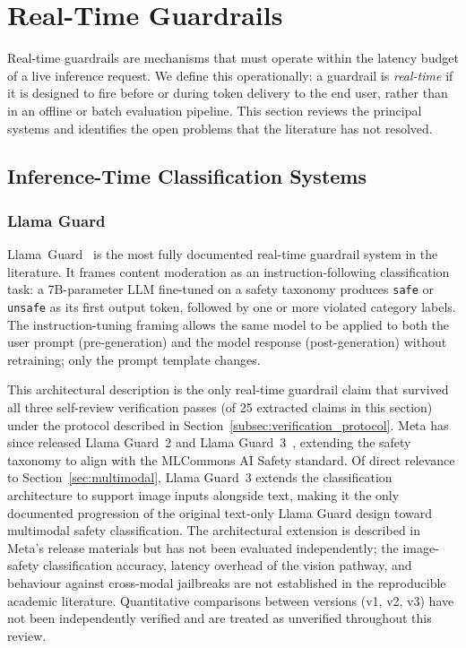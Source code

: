 \section{Real-Time Guardrails}
\label{sec:realtime}

Real-time guardrails are mechanisms that must operate within the latency budget of
a live inference request.
We define this operationally: a guardrail is \emph{real-time} if it is designed to
fire before or during token delivery to the end user, rather than in an offline or
batch evaluation pipeline.
This section reviews the principal systems and identifies the open problems
that the literature has not resolved.

\subsection{Inference-Time Classification Systems}

\subsubsection{Llama Guard}

Llama~Guard~\cite{inan2023llama} is the most fully documented real-time guardrail
system in the literature.
It frames content moderation as an instruction-following classification task:
a 7B-parameter LLM fine-tuned on a safety taxonomy produces \texttt{safe} or
\texttt{unsafe} as its first output token, followed by one or more violated category
labels.
The instruction-tuning framing allows the same model to be applied to both the
user prompt (pre-generation) and the model response (post-generation) without
retraining; only the prompt template changes.

This architectural description is the only real-time guardrail claim that survived
all three self-review verification passes (of 25 extracted claims in this section)
under the protocol described in Section~\ref{subsec:verification_protocol}.
Meta has since released Llama Guard~2 and Llama Guard~3~\cite{meta2024llamaguard2},
extending the safety taxonomy to align with the MLCommons AI Safety standard.
Of direct relevance to Section~\ref{sec:multimodal}, Llama Guard~3 extends the
classification architecture to support image inputs alongside text, making it the
only documented progression of the original text-only Llama Guard design toward
multimodal safety classification.
The architectural extension is described in Meta's release materials but has not
been evaluated independently; the image-safety classification accuracy, latency
overhead of the vision pathway, and behaviour against cross-modal jailbreaks are
not established in the reproducible academic literature.
Quantitative comparisons between versions (v1, v2, v3) have not been independently
verified and are treated as unverified throughout this review.

